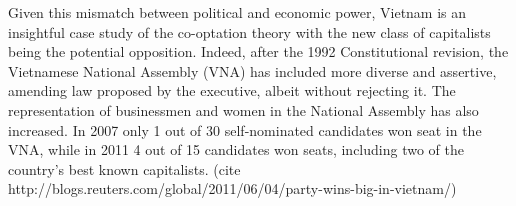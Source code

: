 Given this mismatch between political and economic power, Vietnam is an insightful case study of the co-optation theory with the new class of capitalists being the potential opposition. Indeed, after the 1992 Constitutional revision, the Vietnamese National Assembly (VNA) has included more diverse and assertive, amending law proposed by the executive, albeit without rejecting it. The representation of businessmen and women in the National Assembly has also increased. In 2007 only 1 out of 30 self-nominated candidates won seat in the VNA, while in 2011 4 out of 15 candidates won seats, including two of the country's best known capitalists. (cite http://blogs.reuters.com/global/2011/06/04/party-wins-big-in-vietnam/)

